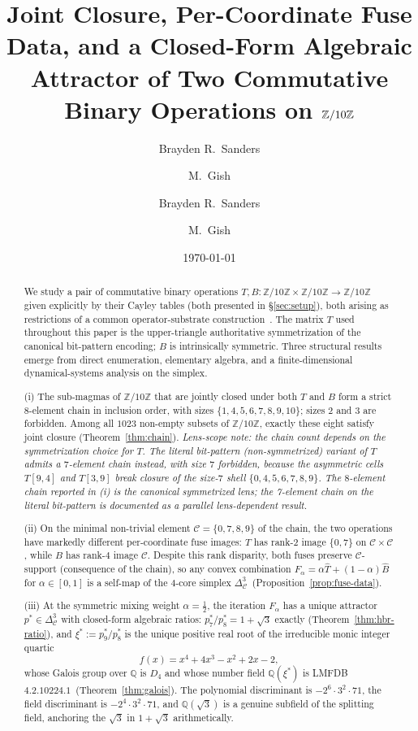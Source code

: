 \documentclass[11pt,reqno]{amsart}
\title[Joint closure on $\Zten$]{Joint Closure, Per-Coordinate Fuse
Data, and a Closed-Form Algebraic Attractor of Two Commutative Binary
Operations on $\Zten$}
\author{Brayden R.\ Sanders \and M.\ Gish}
\author{Brayden R.\ Sanders \and M.\ Gish}
\date{\today}
\theoremstyle{plain}
\theoremstyle{definition}
\theoremstyle{remark}
\newcommand{\Z}{\mathbb{Z}}
\newcommand{\Q}{\mathbb{Q}}
\newcommand{\Zten}{\Z/10\Z}
\newcommand{\Cfour}{\mathcal{C}}
\newcommand{\Tfuse}{\widehat{T}}
\newcommand{\Bfuse}{\widehat{B}}
\begin{document}
\begin{abstract}
We study a pair of commutative binary operations
$T,B:\Zten\times\Zten\to\Zten$ given explicitly by their Cayley
tables (both presented in \S\ref{sec:setup}), both arising as restrictions of a common operator-substrate
construction~\cite{SandersGish2026Sigma}. The matrix $T$ used throughout this paper is the upper-triangle authoritative symmetrization of the canonical bit-pattern encoding; $B$ is intrinsically symmetric. Three structural results
emerge from direct enumeration, elementary algebra, and a
finite-dimensional dynamical-systems analysis on the simplex.

(i) The sub-magmas of $\Zten$ that are jointly closed under both
$T$ and $B$ form a strict $8$-element chain in inclusion order,
with sizes $\{1, 4, 5, 6, 7, 8, 9, 10\}$; sizes $2$ and $3$ are
forbidden. Among all $1023$ non-empty subsets of $\Zten$, exactly
these eight satisfy joint closure (Theorem~\ref{thm:chain}). \emph{Lens-scope note: the chain count depends on the symmetrization choice for $T$. The literal bit-pattern (non-symmetrized) variant of $T$ admits a $7$-element chain instead, with size $7$ forbidden, because the asymmetric cells $T[9,4]$ and $T[3,9]$ break closure of the size-$7$ shell $\{0,4,5,6,7,8,9\}$. The $8$-element chain reported in (i) is the canonical symmetrized lens; the 7-element chain on the literal bit-pattern is documented as a parallel lens-dependent result.}

(ii) On the minimal non-trivial element $\Cfour=\{0,7,8,9\}$ of
the chain, the two operations have markedly different
per-coordinate fuse images: $T$ has rank-$2$ image $\{0, 7\}$ on
$\Cfour\times\Cfour$, while $B$ has rank-$4$ image $\Cfour$.
Despite this rank disparity, both fuses preserve $\Cfour$-support
(consequence of the chain), so any convex combination
$F_\alpha = \alpha\Tfuse + (1-\alpha)\Bfuse$ for $\alpha\in[0,1]$
is a self-map of the $4$-core simplex
$\Delta^{3}_{\Cfour}$~(Proposition~\ref{prop:fuse-data}).

(iii) At the symmetric mixing weight $\alpha=\tfrac12$, the
iteration $F_\alpha$ has a unique attractor
$p^*\in\Delta^{3}_{\Cfour}$ with closed-form algebraic ratios:
$p^*_{7}/p^*_{8}=1+\sqrt{3}$ exactly
(Theorem~\ref{thm:hbr-ratio}), and $\xi^*:=p^*_{9}/p^*_{8}$ is
the unique positive real root of the irreducible monic integer
quartic
\[
  f(x) = x^{4}+4x^{3}-x^{2}+2x-2,
\]
whose Galois group over $\Q$ is $D_{4}$ and whose number field
$\Q(\xi^*)$ is LMFDB~$4.2.10224.1$~(Theorem~\ref{thm:galois}).
The polynomial discriminant is
$-2^{6}\cdot 3^{2}\cdot 71$, the field discriminant is
$-2^{4}\cdot 3^{2}\cdot 71$, and $\Q(\sqrt{3})$ is a genuine
subfield of the splitting field, anchoring the $\sqrt{3}$ in
$1+\sqrt{3}$ arithmetically.


\end{abstract}
\end{document}
